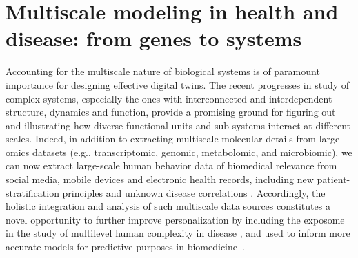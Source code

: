 \documentclass[12pt]{article}
\renewcommand{\(}{\left(}
\renewcommand{\)}{\right)}
\renewcommand{\[}{\left[}
\renewcommand{\]}{\right]}
\begin{document}
\section*{Multiscale modeling in health and disease: from genes to systems}

Accounting for the multiscale nature of biological systems is of paramount importance for designing effective digital twins. The recent progresses in study of complex systems, especially the ones with interconnected and interdependent structure, dynamics and function, provide a promising ground for figuring out and illustrating how diverse functional units and sub-systems interact at different scales. 
%
Indeed, in addition to extracting multiscale molecular details from large omics datasets (e.g., transcriptomic, genomic, metabolomic, and microbiomic), we can now extract large-scale human behavior data of biomedical relevance from social media, mobile devices and electronic health records, including new patient-stratification principles and unknown disease correlations \cite{correia2020mining,steinhubl2015emerging,hoffman2020biomedical,sanchez2024prevalence,dolley2018big,jensen2012mining,nunez2024rare}. 
%
Accordingly, the  holistic integration and analysis of such multiscale data sources constitutes a novel opportunity to further improve personalization by including the exposome in the study of multilevel human complexity in disease \cite{dolley2018big,pescosolido2016social}, 
%
and used to inform more accurate models for predictive purposes in biomedicine~\cite{walpole2013multiscale,lopatkin2020predictive,nunez2024rare,correia2024conserved,kennedy2024multiscale}. 
\end{document}

